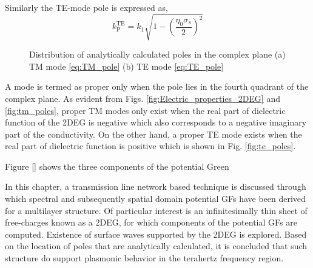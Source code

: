 \documentclass[12pt]{article}
\begin{document}
Similarly the TE-mode pole is expressed as,
%
\begin{equation}
    k^{\mathrm{TE}}_{\mathrm P} = k_1 \sqrt{1 - \left(\frac{\eta_0 \sigma_s}{2}\right)^2}
  \label{eq:TE_pole}%
\end{equation}
%
%
\begin{figure}[!htbp]
  \centering
  \caption{Distribution of analytically calculated poles in the complex plane (a) TM mode \eqref{eq:TM_pole} (b) TE mode \eqref{eq:TE_pole}}
  \label{fig:Complex_poles}
\end{figure}
%

A mode is termed as proper only when the pole lies in the fourth quadrant of the complex plane. As evident from Figs. \ref{fig:Electric_properties_2DEG} and \ref{fig:tm_poles}, proper TM modes only exist when the real part of dielectric function of the 2DEG is negative which also corresponds to a negative imaginary part of the conductivity. On the other hand, a proper TE mode exists when the real part of dielectric function is positive which is shown in Fig. \ref{fig:te_poles}.

Figure \ref{} shows the three components of the potential Green


In this chapter, a transmission line network based technique is discussed through which spectral and subsequently spatial domain potential GFs have been derived for a multilayer structure. Of particular interest is an infinitesimally thin sheet of free-charges known as a 2DEG, for which components of the potential GFs are computed. Existence of surface waves supported by the 2DEG is explored. Based on the location of poles that are analytically calculated, it is concluded that such structure do support plasmonic behavior in the terahertz frequency region.

\clearpage %
% 


\end{document}
